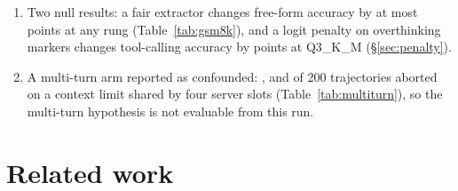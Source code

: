 \documentclass[12pt,letterpaper]{article}
\begin{document}
\begin{enumerate}
\item Two null results: a fair extractor changes free-form accuracy by at most \qtGsmGapMax{} points at any rung (Table~\ref{tab:gsm8k}), and a logit penalty on overthinking markers changes tool-calling accuracy by \qtHfourDropThree{} points at Q3\_K\_M (\S\ref{sec:penalty}).
\item A multi-turn arm reported as confounded: \qtMtCtxErrEight{}, \qtMtCtxErrFour{} and \qtMtCtxErrThree{} of 200 trajectories aborted on a context limit shared by four server slots (Table~\ref{tab:multiturn}), so the multi-turn hypothesis is not evaluable from this run.
\end{enumerate}

\section{Related work}
\end{document}
